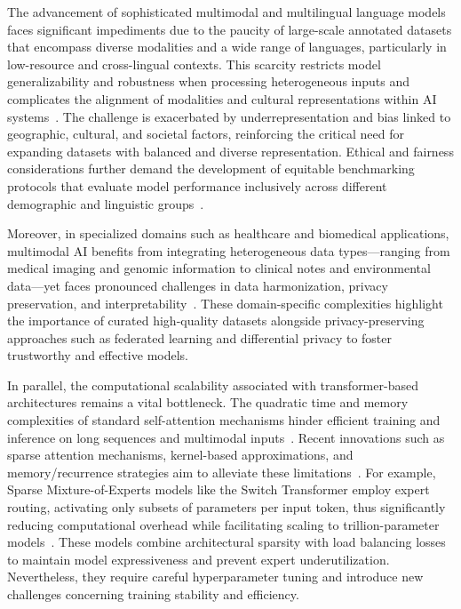 \documentclass[sigconf]{acmart}
\begin{document}
The advancement of sophisticated multimodal and multilingual language models faces significant impediments due to the paucity of large-scale annotated datasets that encompass diverse modalities and a wide range of languages, particularly in low-resource and cross-lingual contexts. This scarcity restricts model generalizability and robustness when processing heterogeneous inputs and complicates the alignment of modalities and cultural representations within AI systems~\cite{ref2,ref4,ref5,ref21,ref28,ref30}. The challenge is exacerbated by underrepresentation and bias linked to geographic, cultural, and societal factors, reinforcing the critical need for expanding datasets with balanced and diverse representation. Ethical and fairness considerations further demand the development of equitable benchmarking protocols that evaluate model performance inclusively across different demographic and linguistic groups~\cite{ref12,ref26,ref27,ref30}.

Moreover, in specialized domains such as healthcare and biomedical applications, multimodal AI benefits from integrating heterogeneous data types—ranging from medical imaging and genomic information to clinical notes and environmental data—yet faces pronounced challenges in data harmonization, privacy preservation, and interpretability~\cite{ref12,ref4}. These domain-specific complexities highlight the importance of curated high-quality datasets alongside privacy-preserving approaches such as federated learning and differential privacy to foster trustworthy and effective models.

In parallel, the computational scalability associated with transformer-based architectures remains a vital bottleneck. The quadratic time and memory complexities of standard self-attention mechanisms hinder efficient training and inference on long sequences and multimodal inputs~\cite{ref2,ref4,ref5,ref21,ref33}. Recent innovations such as sparse attention mechanisms, kernel-based approximations, and memory/recurrence strategies aim to alleviate these limitations~\cite{ref21}. For example, Sparse Mixture-of-Experts models like the Switch Transformer employ expert routing, activating only subsets of parameters per input token, thus significantly reducing computational overhead while facilitating scaling to trillion-parameter models~\cite{ref14,ref33}. These models combine architectural sparsity with load balancing losses to maintain model expressiveness and prevent expert underutilization. Nevertheless, they require careful hyperparameter tuning and introduce new challenges concerning training stability and efficiency.
\end{document}
